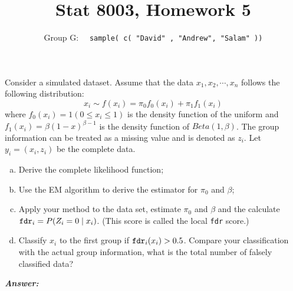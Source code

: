 \documentclass[12pt]{article}
\newenvironment{question}[2][Question]{\begin{trivlist}
\item[\hskip \labelsep {\bfseries #1}\hskip \labelsep {\bfseries #2.}]}{\end{trivlist}}
\begin{document}
 \renewcommand{\arraystretch}{1.3}

 
\title{Stat 8003, Homework 5}%
\author{Group G: \ \ \texttt{sample( c( "David" , "Andrew",  "Salam" ))}
\\ %
} %
 
\maketitle
 
 \begin{question}{5.1}  
 
 Consider a simulated dataset. Assume that the data $x_1, x_2, \cdots , x_n$ follows the following distribution:
 $$
 x_i \sim f(x_i) = \pi_0 f_0(x_i) + \pi_1 f_1(x_i)
 $$
 where $f_0(x_i) = 1(0 \leq x_i \leq 1)$ is the density function of the uniform and $f_1(x_i) = \beta (1 - x)^{\beta - 1} $ is the density function of $Beta(1, \beta)$. The group information can be treated as a
missing value and is denoted as $z_i$. Let $y_i = (x_i, z_i)$ be the complete data.	
 \begin{enumerate}[(a)]
\item Derive the complete likelihood function;
\item Use the EM algorithm to derive the estimator for $\pi_0$ and $\beta$;
\item Apply your method to the data set, estimate $\pi_0$ and $\beta$ and the calculate $\text{\texttt{fdr}}_i = P(Z_i = 0 \mid x_i)$. (This score is called the local \texttt{fdr} score.)
\item Classify $x_i$ to the first group if $\text{\texttt{fdr}}_i(x_i) > 0.5$. Compare your classification with the actual
group information, what is the total number of falsely classified data?
\end{enumerate}
\end{question} 


  \textbf{\color{TealBlue}\emph{Answer:} } 
    
\end{document}
